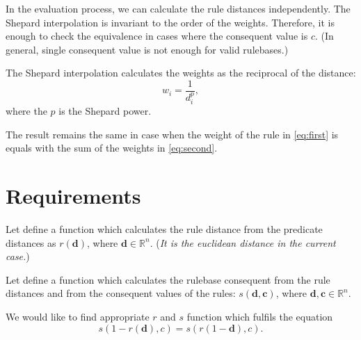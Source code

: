 \documentclass[a4paper,12pt]{article}
\begin{document}
In the evaluation process, we can calculate the rule distances independently. The Shepard interpolation is invariant to the order of the weights. Therefore, it is enough to check the equivalence in cases where the consequent value is $c$. (In general, single consequent value is not enough for valid rulebases.)

The Shepard interpolation calculates the weights as the reciprocal of the distance:
$$
w_i = \dfrac{1}{d_{i}^p},
$$
where the $p$ is the Shepard power.


The result remains the same in case when the weight of the rule in \ref{eq:first} is equals with the sum of the weights in \ref{eq:second}.

\section{Requirements}

Let define a function which calculates the rule distance from the predicate distances as $r(\textbf{d})$, where $\textbf{d} \in \mathbb{R}^n$. (\textit{It is the euclidean distance in the current case.})

Let define a function which calculates the rulebase consequent from the rule distances and from the consequent values of the rules: $s(\textbf{d}, \textbf{c})$, where $\textbf{d}, \textbf{c} \in \mathbb{R}^n$.

We would like to find appropriate $r$ and $s$ function which fulfils the equation
\begin{equation}
s(1 - r(\textbf{d}), c) = s(r(1 - \textbf{d}), c).
\end{equation}
\end{document}
